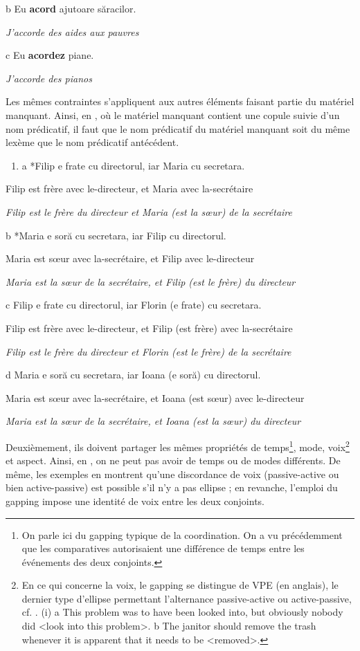   b  Eu \textbf{acord} ajutoare săracilor.

{\itshape
J'accorde des aides aux pauvres} 

  c  Eu \textbf{acordez} piane.

{\itshape
J'accorde des pianos}

Les mêmes contraintes s'appliquent aux autres éléments faisant partie du matériel manquant. Ainsi, en , où le matériel manquant contient une copule suivie d'un nom prédicatif, il faut que le nom prédicatif du matériel manquant soit du même lexème que le nom prédicatif antécédent.


\begin{enumerate}
\item \label{bkm:Ref299484419}a  *Filip e frate cu directorul, iar Maria cu secretara.


\end{enumerate}
Filip est frère avec le-directeur, et Maria avec la-secrétaire

{\itshape
Filip est le frère du directeur et Maria (est la s{\oe}ur) de la secrétaire}

  b  *Maria e soră cu secretara, iar Filip cu directorul.

    Maria est s{\oe}ur avec la-secrétaire, et Filip avec le-directeur

{\itshape
Maria est la s{\oe}ur de la secrétaire, et Filip (est le frère) du directeur} 

  c  Filip e frate cu directorul, iar Florin (e frate) cu secretara.

    Filip est frère avec le-directeur, et Filip (est frère) avec la-secrétaire

{\itshape
Filip est le frère du directeur et Florin (est le frère) de la secrétaire}

  d  Maria e soră cu secretara, iar Ioana (e soră) cu directorul.

    Maria est s{\oe}ur avec la-secrétaire, et Ioana (est s{\oe}ur) avec le-directeur

{\itshape
  Maria est la s{\oe}ur de la secrétaire, et Ioana (est la s{\oe}ur) du directeur} 

Deuxièmement, ils doivent partager les mêmes propriétés de temps\footnote{On parle ici du gapping typique de la coordination. On a vu précédemment que les comparatives autorisaient une différence de temps entre les événements des deux conjoints.}, mode, voix\footnote{En ce qui concerne la voix, le gapping se distingue de VPE (en anglais), le dernier type d'ellipse permettant l'alternance passive-active ou active-passive, cf. \citet[31]{Merchant2009}.
(i)  a  This problem was to have been looked into, but obviously nobody did {\textless}look into this problem{\textgreater}.   b  The janitor should remove the trash whenever it is apparent that it needs to be {\textless}removed{\textgreater}. }  et aspect. Ainsi, en , on ne peut pas avoir de temps ou de modes différents. De même, les exemples en  montrent qu'une discordance de voix (passive-active ou bien active-passive) est possible s'il n'y a pas ellipse ; en revanche, l'emploi du gapping impose une identité de voix entre les deux conjoints.


